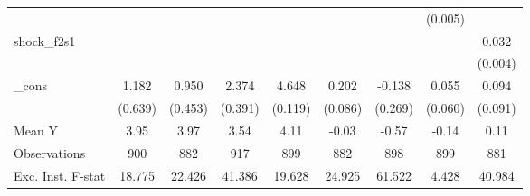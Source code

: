 {\begin{tabular}{l*{8}{c}}
            &                     &                     &                     &                     &                     &                     &     (0.005)         &                     \\
\addlinespace
shock\_f2s1  &                     &                     &                     &                     &                     &                     &                     &       0.032\sym{***}\\
            &                     &                     &                     &                     &                     &                     &                     &     (0.004)         \\
\addlinespace
\_cons      &       1.182\sym{*}  &       0.950\sym{**} &       2.374\sym{***}&       4.648\sym{***}&       0.202\sym{**} &      -0.138         &       0.055         &       0.094         \\
            &     (0.639)         &     (0.453)         &     (0.391)         &     (0.119)         &     (0.086)         &     (0.269)         &     (0.060)         &     (0.091)         \\
\midrule
Mean Y      &        3.95         &        3.97         &        3.54         &        4.11         &       -0.03         &       -0.57         &       -0.14         &        0.11         \\
Observations&         900         &         882         &         917         &         899         &         882         &         898         &         899         &         881         \\
Exc. Inst. F-stat&      18.775         &      22.426         &      41.386         &      19.628         &      24.925         &      61.522         &       4.428         &      40.984         \\
\bottomrule
\end{tabular}
}
